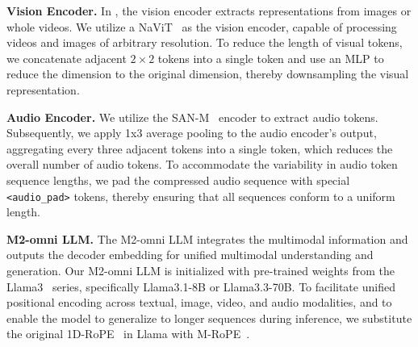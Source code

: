 \textbf{Vision Encoder.}
In \method, the vision encoder extracts representations from images or whole videos. We utilize a NaViT~\cite{navit_2024}  as the vision encoder, capable of processing videos and images of arbitrary resolution. To reduce the length of visual tokens, we concatenate adjacent $2\times2$ tokens into a single token and use an MLP to reduce the dimension to the original dimension, thereby downsampling the visual representation.


\textbf{Audio Encoder.}
We utilize the SAN-M~\cite{gao2020san, gao2022paraformer} encoder to extract audio tokens. Subsequently, we apply 1x3 average pooling to the audio encoder's output, aggregating every three adjacent tokens into a single token, which reduces the overall number of audio tokens. To accommodate the variability in audio token sequence lengths, we pad the compressed audio sequence with special \texttt{<audio\_pad>}  tokens, thereby ensuring that all sequences conform to a uniform length.



\textbf{M2-omni LLM.} The M2-omni LLM integrates the multimodal information and outputs the decoder embedding for unified multimodal understanding and generation. Our M2-omni LLM is initialized with pre-trained weights from the Llama3~\cite{llama_2023, llama3_2024} series, specifically Llama3.1-8B or Llama3.3-70B. To facilitate unified positional encoding across textual, image, video, and audio modalities, and to enable the model to generalize to longer sequences during inference, we substitute the original 1D-RoPE~\cite{su2024roformer} in Llama with M-RoPE~\cite{qwen2-vl_2024}.

